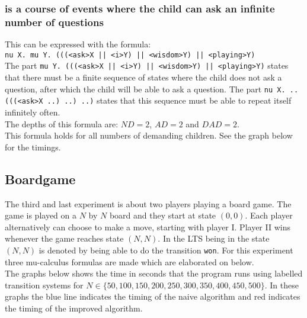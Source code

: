 \documentclass[10pt,a4paper]{article}
\begin{document}
\subsubsection{is a course of events where the child can ask an infinite number of questions}
This can be expressed with the formula:\\
{\tt nu X. mu Y. (((<ask>X || <i>Y) || <wisdom>Y) || <playing>Y)}\\
The part {\tt mu Y. (((<ask>X || <i>Y) || <wisdom>Y) || <playing>Y)} states that there must be a finite sequence of states where the child does not ask a question, after which the child will be able to ask a question. The part {\tt nu X. .. (((<ask>X ..) ..) ..)} states that this sequence must be able to repeat itself infinitely often.\\
The depths of this formula are: $ND = 2$, $AD = 2$ and $DAD = 2$.\\
This formula holds for all numbers of demanding children. See the graph below for the timings.\\



\subsection{Boardgame}
The third and last experiment is about two players playing a board game. The game is played on a $N$ by $N$ board and they start at state $(0, 0)$. Each player alternatively can choose to make a move, starting with player I. Player II wins whenever the game reaches state $(N, N)$. In the LTS being in the state $(N, N)$ is denoted by being able to do the transition {\tt won}. For this experiment three mu-calculus formulas are made which are elaborated on below.\\
The graphs below shows the time in seconds that the program runs using labelled transition systems for $N \in \{50, 100, 150, 200, 250, 300, 350, 400, 450, 500\}$. In these graphs the blue line indicates the timing of the naive algorithm and red indicates the timing of the improved algorithm.
\end{document}
